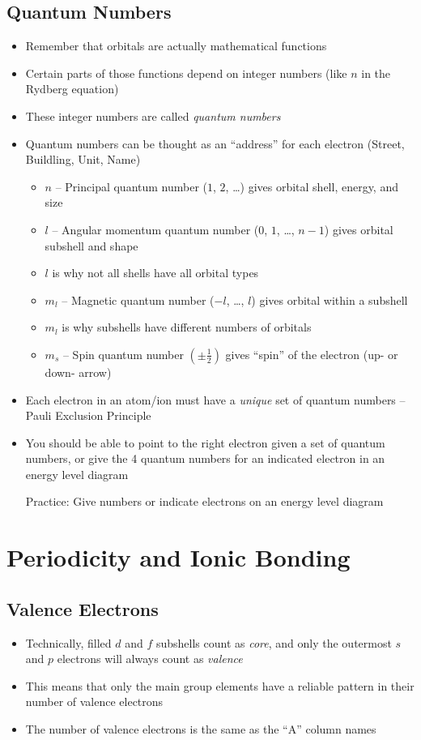 \documentclass[12pt, openany, letterpaper]{memoir}
\begin{document}
\section{Quantum Numbers}
\begin{itemize}
	\item Remember that orbitals are actually mathematical functions
	\item Certain parts of those functions depend on integer numbers (like $n$ in the Rydberg equation)
	\item These integer numbers are called \emph{quantum numbers}
	\item Quantum numbers can be thought as an ``address'' for each electron (Street, Buildling, Unit, Name)
	\begin{itemize}
		\item $n$ -- Principal quantum number ($1$, $2$, \ldots) gives orbital shell, energy, and size
		\item $l$ -- Angular momentum quantum number ($0$, $1$, \ldots, $n-1$) gives orbital subshell and shape
		\item $l$ is why not all shells have all orbital types
		\item $m_l$ -- Magnetic quantum number ($-l$, \ldots, $l$) gives orbital within a subshell
		\item $m_l$ is why subshells have different numbers of orbitals
		\item $m_s$ -- Spin quantum number $\left(\pm \frac{1}{2}\right)$ gives ``spin'' of the electron (up- or down- arrow)		
	\end{itemize}
	\item Each electron in an atom/ion must have a \emph{unique} set of quantum numbers -- Pauli Exclusion Principle
	\item You should be able to point to the right electron given a set of quantum numbers, or give the 4 quantum numbers for an indicated electron in an energy level diagram

	Practice: Give numbers or indicate electrons on an energy level diagram 
\end{itemize}

\chapter{Periodicity and Ionic Bonding}
\section{Valence Electrons}
\begin{itemize}
	\item Technically, filled $d$ and $f$ subshells count as \emph{core}, and only the outermost $s$ and $p$ electrons will always count as \emph{valence}
	\item This means that only the main group elements have a reliable pattern in their number of valence electrons
	\item The number of valence electrons is the same as the ``A'' column names
\end{itemize}
\end{document}
